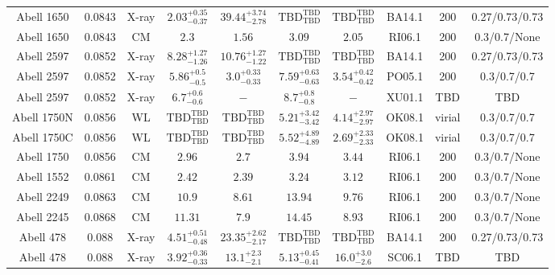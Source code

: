 \begin{table}
\begin{tabular}{cccccccccc}
Abell 1650 & 0.0843 & X-ray & ${2.03}^{+0.35}_{-0.37}$ & ${39.44}^{+3.74}_{-2.78}$ & ${\mathrm{TBD}}^{\mathrm{TBD}}_{\mathrm{TBD}}$ & ${\mathrm{TBD}}^{\mathrm{TBD}}_{\mathrm{TBD}}$ & BA14.1 & 200 & 0.27/0.73/0.73 \\
Abell 1650 & 0.0843 & CM & ${2.3}^{}_{}$ & ${1.56}^{}_{}$ & ${3.09}^{}_{}$ & ${2.05}^{}_{}$ & RI06.1 & 200 & 0.3/0.7/None \\
Abell 2597 & 0.0852 & X-ray & ${8.28}^{+1.27}_{-1.26}$ & ${10.76}^{+1.27}_{-1.22}$ & ${\mathrm{TBD}}^{\mathrm{TBD}}_{\mathrm{TBD}}$ & ${\mathrm{TBD}}^{\mathrm{TBD}}_{\mathrm{TBD}}$ & BA14.1 & 200 & 0.27/0.73/0.73 \\
Abell 2597 & 0.0852 & X-ray & ${5.86}^{+0.5}_{-0.5}$ & ${3.0}^{+0.33}_{-0.33}$ & ${7.59}^{+0.63}_{-0.63}$ & ${3.54}^{+0.42}_{-0.42}$ & PO05.1 & 200 & 0.3/0.7/0.7 \\
Abell 2597 & 0.0852 & X-ray & ${6.7}^{+0.6}_{-0.6}$ & ${-}^{}_{}$ & ${8.7}^{+0.8}_{-0.8}$ & ${-}^{}_{}$ & XU01.1 & TBD & TBD \\
Abell 1750N & 0.0856 & WL & ${\mathrm{TBD}}^{\mathrm{TBD}}_{\mathrm{TBD}}$ & ${\mathrm{TBD}}^{\mathrm{TBD}}_{\mathrm{TBD}}$ & ${5.21}^{+3.42}_{-3.42}$ & ${4.14}^{+2.97}_{-2.97}$ & OK08.1 & virial & 0.3/0.7/0.7 \\
Abell 1750C & 0.0856 & WL & ${\mathrm{TBD}}^{\mathrm{TBD}}_{\mathrm{TBD}}$ & ${\mathrm{TBD}}^{\mathrm{TBD}}_{\mathrm{TBD}}$ & ${5.52}^{+4.89}_{-4.89}$ & ${2.69}^{+2.33}_{-2.33}$ & OK08.1 & virial & 0.3/0.7/0.7 \\
Abell 1750 & 0.0856 & CM & ${2.96}^{}_{}$ & ${2.7}^{}_{}$ & ${3.94}^{}_{}$ & ${3.44}^{}_{}$ & RI06.1 & 200 & 0.3/0.7/None \\
Abell 1552 & 0.0861 & CM & ${2.42}^{}_{}$ & ${2.39}^{}_{}$ & ${3.24}^{}_{}$ & ${3.12}^{}_{}$ & RI06.1 & 200 & 0.3/0.7/None \\
Abell 2249 & 0.0863 & CM & ${10.9}^{}_{}$ & ${8.61}^{}_{}$ & ${13.94}^{}_{}$ & ${9.76}^{}_{}$ & RI06.1 & 200 & 0.3/0.7/None \\
Abell 2245 & 0.0868 & CM & ${11.31}^{}_{}$ & ${7.9}^{}_{}$ & ${14.45}^{}_{}$ & ${8.93}^{}_{}$ & RI06.1 & 200 & 0.3/0.7/None \\
Abell 478 & 0.088 & X-ray & ${4.51}^{+0.51}_{-0.48}$ & ${23.35}^{+2.62}_{-2.17}$ & ${\mathrm{TBD}}^{\mathrm{TBD}}_{\mathrm{TBD}}$ & ${\mathrm{TBD}}^{\mathrm{TBD}}_{\mathrm{TBD}}$ & BA14.1 & 200 & 0.27/0.73/0.73 \\
Abell 478 & 0.088 & X-ray & ${3.92}^{+0.36}_{-0.33}$ & ${13.1}^{+2.3}_{-2.1}$ & ${5.13}^{+0.45}_{-0.41}$ & ${16.0}^{+3.0}_{-2.6}$ & SC06.1 & TBD & TBD \\

\end{tabular}
\end{table}
